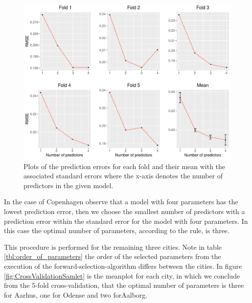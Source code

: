     \begin{figure}[H]
        \centering
      \includegraphics[width = 1 \textwidth]{figures/Nanna/CrossValidationCopenhagen.pdf}
      \caption{Plots of the prediction errors for each fold and their mean with the associated standard errors where the x-axis denotes the number of predictors in the given model.}
      \label{fig:CrossValidationCopenhagen}
    \end{figure}
    
In the case of Copenhagen observe that a model with four parameters has the lowest prediction error, then we choose the smallest number of predictors with a prediction error within the standard error for the model with four parameters.
In this case the optimal number of parameters, according to the rule, is three.

This procedure is performed for the remaining three cities. Note in table \ref{tbl:order_of_parameters} the order of the selected parameters from the execution of the forward-selection-algorithm differs between the cities. 
In figure \ref{fig:CrossValidationSamlet} is the meanplot for each city, in which we conclude from the 5-fold cross-validation, that the optimal number of parameters is three for Aarhus, one for Odense and two forAalborg.

